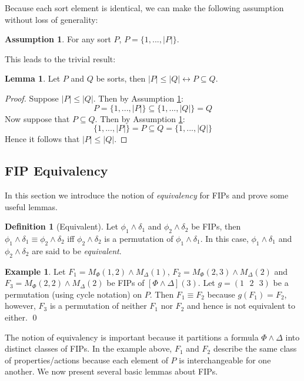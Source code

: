 \documentclass[12pt]{article}
\theoremstyle{definition}
\newtheorem{assumption}{Assumption}
\newtheorem{lemma}{Lemma}
\newtheorem{definition}{Definition}
\newtheorem{example}{Example}
\theoremstyle{remark}
\newcommand{\msp}{\text{ }}
\begin{document}
\noindent Because each sort element is identical, we can make the following assumption without loss of generality:

\begin{assumption}
  \label{asmp:sort}
  For any sort $P$, $P = \{1,...,|P|\}$.  
\end{assumption}

\noindent This leads to the trivial result:

\begin{lemma}
  \label{lem:monot-card}
  Let $P$ and $Q$ be sorts, then $|P| \leq |Q| \leftrightarrow P \subseteq Q$.  
\end{lemma}
\begin{proof}
  Suppose $|P| \leq |Q|$.  Then by Assumption \ref{asmp:sort}:
  $$P = \{1,...,|P|\} \subseteq \{1,...,|Q|\} = Q$$
  Now suppose that $P \subseteq Q$.  Then by Assumption \ref{asmp:sort}:
  $$\{1,...,|P|\} = P \subseteq Q = \{1,...,|Q|\}$$
  Hence it follows that $|P| \leq |Q|$.
\end{proof}


\subsection{FIP Equivalency}

In this section we introduce the notion of \textit{equivalency} for FIPs and prove some useful lemmas.

\begin{definition}[Equivalent]
  Let $\phi_1\land\delta_1$ and $\phi_2\land\delta_2$ be FIPs, then $\phi_1\land\delta_1 \equiv \phi_2\land\delta_2$ iff $\phi_2\land\delta_2$ is a permutation of $\phi_1\land\delta_1$.  In this case, $\phi_1\land\delta_1$ and $\phi_2\land\delta_2$ are said to be \textit{equivalent}.
\end{definition}

\begin{example}
  Let $F_1 = M_{\Phi}(1,2) \land M_{\Delta}(1)$, $F_2 = M_{\Phi}(2,3) \land M_{\Delta}(2)$ and $F_3 = M_{\Phi}(2,2) \land M_{\Delta}(2)$ be FIPs of $[\Phi\land\Delta](3)$.  Let $g = (1 \msp 2 \msp 3)$ be a permutation (using cycle notation) on $P$.  Then $F_1 \equiv F_2$ because $g(F_1) = F_2$, however, $F_3$ is a permutation of neither $F_1$ nor $F_2$ and hence is not equivalent to either.
  \qed
\end{example}

The notion of equivalency is important because it partitions a formula $\Phi \land \Delta$ into distinct classes of FIPs.  In the example above, $F_1$ and $F_2$ describe the same class of properties/actions because each element of $P$ is interchangeable for one another.  We now present several basic lemmas about FIPs.
\end{document}
